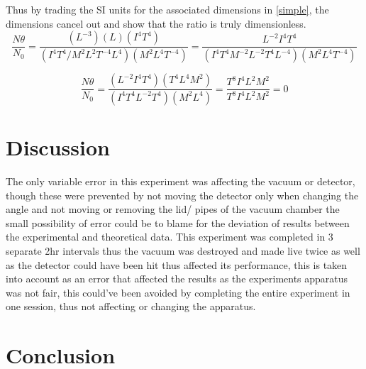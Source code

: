 \documentclass[12pt]{article}
\begin{document}
\vspace{0.5cm}

Thus by trading the SI units for the associated dimensions in \cref{simple}, the dimensions cancel out and show that the ratio is truly dimensionless. \\ 

\begin{equation}
\dfrac{N\theta}{N_0} = \dfrac{(L^{-3})(L)(I^4T^4)}{(I^4T^4 / M^2L^2T^{-4}L^4)(M^2L^4T^{-4})} = \dfrac{L^{-2} I^4 T^4}{(I^{4}T^{4}M^{-2}L^{-2}T^{4}L^{-4})(M^2L^4T^{-4})}
\end{equation}

\begin{equation}
\dfrac{N\theta}{N_0} = \dfrac{(L^{-2}I^4T^4)(T^4 L^4 M^2)}{(I^{4}T^{4}L^{-2}T^{4})(M^2L^4)} = \dfrac{T^8 I^4 L^2 M^2}{T^8 I^4 L^2 M^2} = 0
\end{equation}

\section{Discussion}
\label{Disscussion Section}

The only variable error in this experiment was affecting the vacuum or detector, though these were prevented by not moving the detector only when changing the angle and not moving or removing the lid/ pipes of the vacuum chamber the small possibility of error could be to blame for the deviation of results between the experimental and theoretical data. This experiment was completed in 3 separate 2hr intervals thus the vacuum was destroyed and made live twice as well as the detector could have been hit thus affected its performance, this is taken into account as an error that affected the results as the experiments apparatus was not fair, this could've been avoided by completing the entire experiment in one session, thus not affecting or changing the apparatus. \\



\section{Conclusion}
\label{Conclusion Section}
\end{document}
